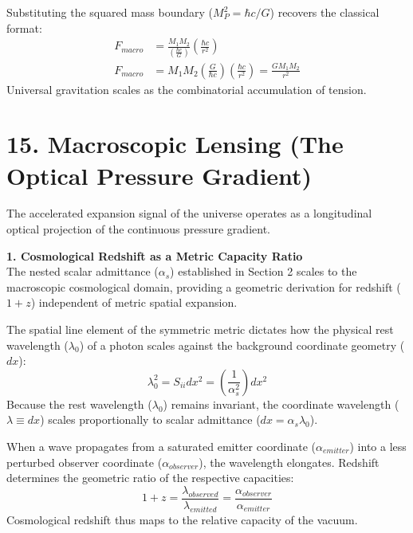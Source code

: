 Substituting the squared mass boundary ($M_P^2 = \hbar c / G$) recovers the classical format:
\begin{align}
    F_{macro} &= \frac{M_1 M_2}{\left( \frac{\hbar c}{G} \right)} \left( \frac{\hbar c}{r^2} \right) \nonumber \\
    F_{macro} &= M_1 M_2 \left( \frac{G}{\hbar c} \right) \left( \frac{\hbar c}{r^2} \right) = \frac{G M_1 M_2}{r^2}
\end{align}
Universal gravitation scales as the combinatorial accumulation of tension.



\section*{15. Macroscopic Lensing (The Optical Pressure Gradient)}

The accelerated expansion signal of the universe operates as a longitudinal optical projection of the continuous pressure gradient.

\textbf{1. Cosmological Redshift as a Metric Capacity Ratio} \\ 
The nested scalar admittance ($\alpha_s$) established in Section 2 scales to the macroscopic cosmological domain, providing a geometric derivation for redshift ($1+z$) independent of metric spatial expansion. 

The spatial line element of the symmetric metric dictates how the physical rest wavelength ($\lambda_0$) of a photon scales against the background coordinate geometry ($dx$):
\begin{equation}
    \lambda_0^2 = S_{ii} dx^2 = \left( \frac{1}{\alpha_s^2} \right) dx^2
\end{equation}
Because the rest wavelength ($\lambda_0$) remains invariant, the coordinate wavelength ($\lambda \equiv dx$) scales proportionally to scalar admittance ($dx = \alpha_s \lambda_0$). 

When a wave propagates from a saturated emitter coordinate ($\alpha_{emitter}$) into a less perturbed observer coordinate ($\alpha_{observer}$), the wavelength elongates. Redshift determines the geometric ratio of the respective capacities:
\begin{equation}
    1 + z = \frac{\lambda_{observed}}{\lambda_{emitted}} = \frac{\alpha_{observer}}{\alpha_{emitter}} \label{eq:redshift_capacity_ratio}
\end{equation}
Cosmological redshift thus maps to the relative capacity of the vacuum.


